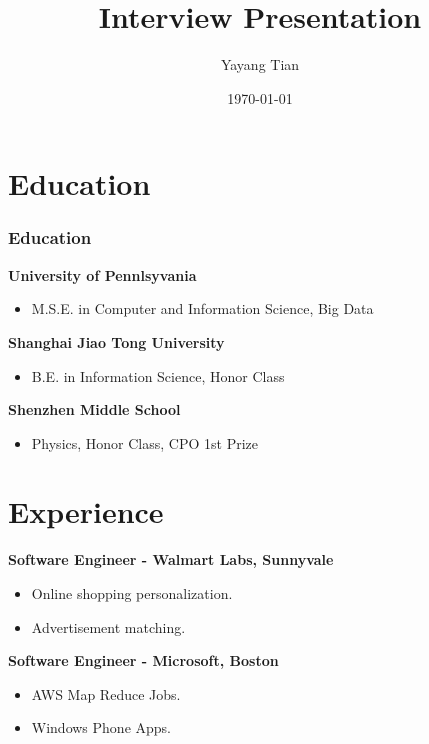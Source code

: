 \documentclass{beamer}
\title[Interview Presentation]{Interview Presentation} %
\author{Yayang Tian} %
\institute[UPenn] %
{
University of Pennsylvania \\ %
\medskip
\textit{yayangtian@gmail.com} %
}
\date{\today} %
\begin{document}
\begin{frame}
\titlepage %
\end{frame}





\large


\section{Education}

\begin{frame}
\frametitle{Education}
\textbf{University of Pennlsyvania}
\begin{itemize}
\item M.S.E. in Computer and Information Science, Big Data
\end{itemize}

\textbf{Shanghai Jiao Tong University}
\begin{itemize}
\item B.E. in Information Science, Honor Class
\end{itemize}

\textbf{Shenzhen Middle School}
\begin{itemize}
\item Physics, Honor Class, CPO 1st Prize
\end{itemize}

\end{frame}


\section{Experience}

\textbf{Software Engineer - Walmart Labs, Sunnyvale}
\begin{itemize}
\item Online shopping personalization. 
\item Advertisement matching.
\end{itemize}

\textbf{Software Engineer - Microsoft, Boston}
\begin{itemize}
\item AWS Map Reduce Jobs.
\item Windows Phone Apps. 
\end{itemize}
\end{document}
